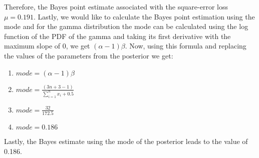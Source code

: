 Therefore, the Bayes point estimate associated with the square-error loss $\mu = 0.191$.\newline
Lastly, we would like to calculate the Bayes point estimation using the mode and for the gamma distribution the mode can be calculated using the log function of the PDF of the gamma and taking its first derivative with the maximum slope of 0, we get $(\alpha -1)\beta$. Now, using this formula and replacing the values of the parameters from the posterior we get:
\begin{enumerate}
    \item $mode = (\alpha -1)\beta$
    \item $mode = \frac{(3n+3 -1)}{\sum_{i=1}^{n}x_i +0.5}$
    \item $mode = \frac{32}{172.5}$
    \item $mode = 0.186$
\end{enumerate}
Lastly, the Bayes estimate using the mode of the posterior leads to the value of 0.186.